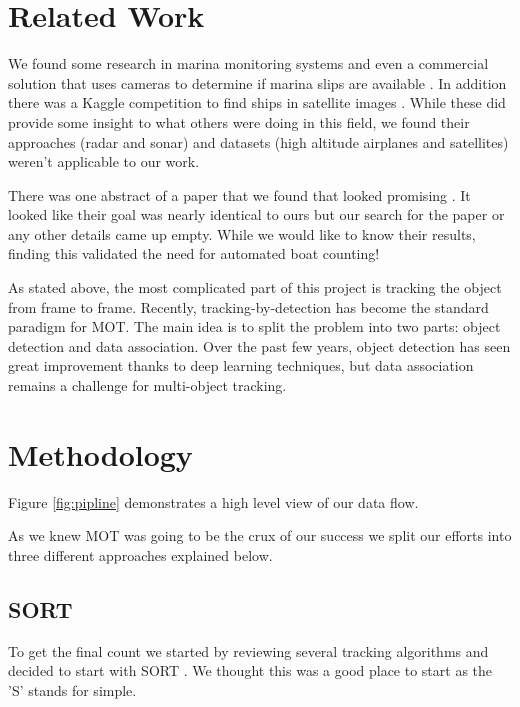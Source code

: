 \documentclass[10pt,twocolumn,letterpaper]{article}
\begin{document}
\section{Related Work}

We found some research in marina monitoring systems \cite{marina_boatdetector} and even a commercial solution that uses cameras to determine if marina slips are available \cite{Nuvis}. In addition there was a Kaggle competition to find ships in satellite images \cite{kaggle_ship_detection, Stofa_2020}. While these did provide some insight to what others were doing in this field, we found their approaches (radar and sonar) and datasets (high altitude airplanes and satellites) weren't applicable to our work.

There was one abstract of a paper that we found that looked promising \cite{UCalagary}. It looked like their goal was nearly identical to ours but our search for the paper or any other details came up empty. While we would like to know their results, finding this validated the need for automated boat counting!

As stated above, the most complicated part of this project is tracking the object from frame to frame. Recently, tracking-by-detection has become the standard paradigm for MOT. The main idea is to split the problem into two parts: object detection and data association. Over the past few years, object detection has seen great improvement thanks to deep learning techniques\cite{https://doi.org/10.48550/arxiv.1506.01497}, but data association remains a challenge for multi-object tracking.

\section{Methodology}

Figure \ref{fig:pipline} demonstrates a high level view of our data flow. 

As we knew MOT was going to be the crux of our success we split our efforts into three different approaches explained below.

\subsection{SORT}

To get the final count we started by reviewing several tracking algorithms and decided to start with SORT \cite{Bewley_2016}. We thought this was a good place to start as the 'S' stands for simple. 
\end{document}
